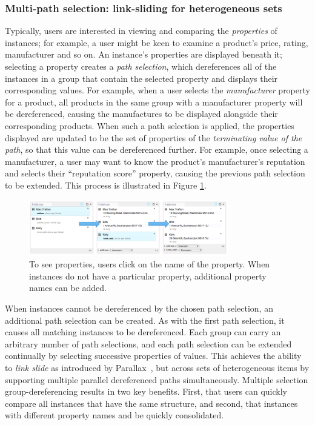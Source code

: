 \documentclass{sigchi}
\begin{document}
\subsubsection{Multi-path selection: link-sliding for heterogeneous sets}

Typically, users are interested in viewing and comparing the \emph{properties} of instances; for example, a user might be keen to examine a product's price, rating, manufacturer and so on.  An instance's properties are displayed beneath it; selecting a property creates a \emph{path selection}, which dereferences all of the instances in a group that contain the selected property and displays their corresponding values.  For example, when a user selects the \emph{manufacturer} property for a product, all products in the same group with a manufacturer property will be dereferenced, causing the manufactures to be displayed alongside their corresponding products.  When such a path selection is applied, the properties displayed are updated to be the set of properties of the \emph{terminating value of the path}, so that this value can be dereferenced further.  For example, once selecting a manufacturer, a user may want to know the product's manufacturer's reputation and selects their ``reputation score'' property, causing the previous path selection to be extended. This process is illustrated in Figure \ref{fig:multipathing}.

\begin{figure}[h]
\begin{center}
\includegraphics[width=8.7cm]{img/multipathing}
\caption{To see properties, users click on the name of the property. When instances do not have a particular property, additional property names can be added.}
\label{fig:multipathing}
\end{center}
\end{figure}

When instances cannot be dereferenced by the chosen path selection, an additional path selection can be created. As with the first path selection, it causes all matching instances to be dereferenced.  Each group can carry an arbitrary number of path selections, and each path selection can be extended continually by selecting successive properties of values. This achieves the ability to \emph{link slide} as introduced by Parallax~\cite{parallax}, but across sets of heterogeneous items by supporting multiple parallel dereferenced paths simultaneously.  Multiple selection group-dereferencing results in two key benefits. First, that users can quickly compare all instances that have the same structure, and second, that instances with different property names and be quickly consolidated.
\end{document}

